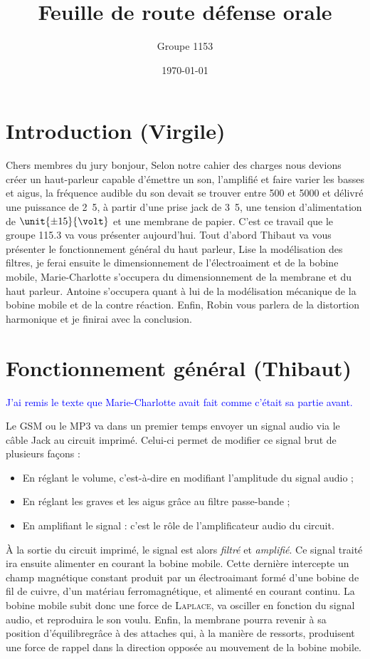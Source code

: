 \documentclass{article}
\title{Feuille de route défense orale}
\author{Groupe 1153}
\date{\today}
\begin{document}
\maketitle

\section{Introduction (Virgile)}
Chers membres du jury bonjour,
Selon notre cahier des charges nous devions créer un haut-parleur capable d'émettre un son,
l'amplifié et faire varier les basses et aigus, la fréquence audible du son devait se trouver
entre \unit{500}{\hertz} et \unit{5000}{\hertz} et délivré une puissance de \unit{2.5}{\watt},
à partir d'une prise jack de \unit{3.5}{\milli\meter}, une tension d'alimentation de $\unit{\pm 15}{\volt}$ 
et une membrane de papier. C'est ce travail que le groupe 115.3 va vous présenter aujourd'hui.
Tout d'abord Thibaut va vous présenter le fonctionnement général du haut parleur, Lise
la modélisation des filtres, je ferai ensuite le dimensionnement de l'électroaiment et de la bobine mobile, 
Marie-Charlotte s'occupera du dimensionnement de la membrane et du haut parleur. Antoine s'occupera quant à lui
de la modélisation mécanique de la bobine mobile et de la contre réaction. Enfin, Robin vous parlera de la
distortion harmonique et je finirai avec la conclusion.

\section{Fonctionnement général (Thibaut)}

\textcolor{blue}{J'ai remis le texte que Marie-Charlotte avait fait comme c'était sa partie avant.}

Le GSM ou le MP3 va dans un premier temps envoyer un signal audio via le câble Jack au circuit imprimé. Celui-ci permet
de modifier ce signal brut de plusieurs façons :

\begin{itemize}
	\item En réglant le volume, c'est-à-dire en modifiant l'amplitude du signal audio ;
	\item En réglant les graves et les aigus grâce au filtre passe-bande ;
	\item En amplifiant le signal : c'est le rôle de l'amplificateur audio du circuit.
\end{itemize}

À la sortie du circuit imprimé, le signal est alors \textit{filtré} et \textit{amplifié}.
Ce signal traité ira ensuite alimenter en courant la bobine mobile. Cette dernière intercepte un champ magnétique constant 
produit par un électroaimant formé d'une bobine de fil de cuivre, d'un matériau ferromagnétique, et alimenté en courant continu.
La bobine mobile subit donc une force de \textsc{Laplace}, va osciller en fonction du  signal audio, et reproduira le son voulu.
Enfin, la membrane pourra revenir à sa position d'équilibregrâce à des attaches qui, à la manière de ressorts, produisent une
force de rappel dans la direction opposée au mouvement de la bobine mobile. 
\end{document}
